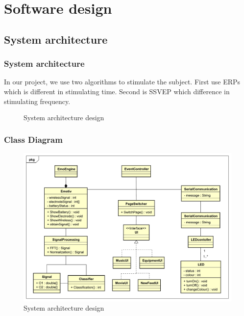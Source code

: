 \chapter{Software design}

\label{ch:Software design}

\setlength{\parindent}{4em}
\setlength{\parskip}{1em}
\renewcommand{\baselinestretch}{1.5}

\section{System architecture}

\subsection{System architecture}
\hspace{1.5cm}In our project, we use two algorithms to stimulate the subject. First use ERPs which is different in stimulating time. Second is SSVEP which difference in stimulating frequency.

\begin{figure}[h]
	\centering
	\caption{System architecture design}
\end{figure}
\subsection{Class Diagram}

\begin{figure}[h]
	\centering
	\includegraphics[scale = 0.3]{chapter5/Class.pdf}
	\caption{System architecture design}
\end{figure}